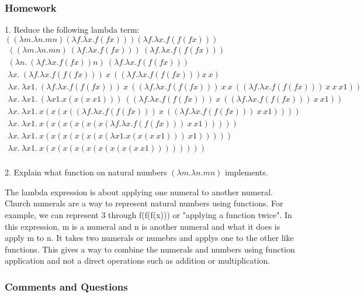 \documentclass{article}
\theoremstyle{theorem}
\theoremstyle{definition}
\theoremstyle{remark}
\begin{document}
\subsubsection{Homework}
1. Reduce the following lambda term:
$((\lambda m. \lambda n. m n) (\lambda f. \lambda x. f (f x))) (\lambda f. \lambda x. f (f (f x)))$ 
  \begin{align*}
  ((\lambda m. \lambda n. m n)\ (\lambda f. \lambda x. f (f x)))\ (\lambda f. \lambda x. f (f (f x))) \\
  (\lambda n.\ (\lambda f.\lambda x. f (f x)) n)\ (\lambda f.\lambda x. f (f (f x))) \\
  \lambda x.\ (\lambda f.\lambda x. f (f (f x)))\ x\ ((\lambda f.\lambda x. f (f (f x))) x\ x) \\
  \lambda x.\ \lambda x1.\ (\lambda f.\lambda x. f (f (f x)))\ x\ ((\lambda f.\lambda x. f (f (f x)))\ x\ x\ ((\lambda f.\lambda x. f (f (f x)))\ x\ x\ x1)) \\
  \lambda x.\ \lambda x1.\ (\lambda x1. x (x (x\ x1)))\ ((\lambda f.\lambda x. f (f (f x)))\ x\ ((\lambda f.\lambda x. f (f (f x)))\ x\ x1)) \\
  \lambda x.\ \lambda x1.\ x (x (x ((\lambda f.\lambda x. f (f (f x)))\ x\ ((\lambda f.\lambda x. f (f (f x)))\ x\ x1)))) \\
  \lambda x.\ \lambda x1.\ x (x (x (x (x (x (\lambda f.\lambda x. f (f (f x)))\ x\ x1))))) \\
  \lambda x.\ \lambda x1.\ x (x (x (x (x (x (\lambda x1. x (x (x\ x1)))\ x1))))) \\
  \lambda x.\ \lambda x1.\ x (x (x (x (x (x (x (x (x\ x1)))))))) \\
\end{align*}

2. Explain what function on natural numbers $(\lambda m. \lambda n. m n)$ implements.

The lambda expression is about applying one numeral to another numeral. Church numerals are a way to represent natural numbers using functions. For example, we can represent 3 through f(f(f(x))) or "applying a function twice". In this expression, 
m is a numeral and n is another numeral and what it does is apply m to n. It takes two numerals or numebrs and applys one to the other like functions. This gives a way to combine the numerals and numbers using function application and not a direct operations
such as addition or multiplication.

\subsubsection{Comments and Questions}
\end{document}
